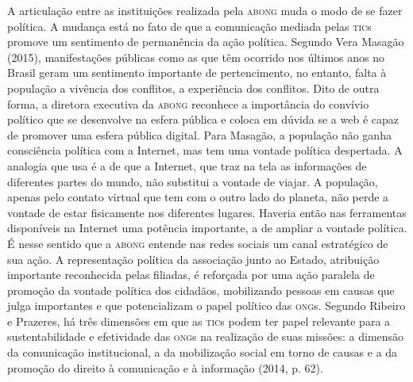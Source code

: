 A articulação entre as instituições realizada pela \textsc{abong} muda o modo de
se fazer política. A mudança está no fato de que a comunicação mediada
pelas \textsc{tic}s promove um sentimento de permanência da ação política.
Segundo Vera Masagão (2015), manifestações públicas como as que têm
ocorrido nos últimos anos no Brasil geram um sentimento importante de
pertencimento, no entanto, falta à população a vivência dos conflitos, a
experiência dos conflitos. Dito de outra forma, a diretora executiva da
\textsc{abong} reconhece a importância do convívio político que se desenvolve na
esfera pública e coloca em dúvida se a web é capaz de promover uma
esfera pública digital. Para Masagão, a população não ganha consciência
política com a Internet, mas tem uma vontade política despertada. A
analogia que usa é a de que a Internet, que traz na tela as informações
de diferentes partes do mundo, não substitui a vontade de viajar. A
população, apenas pelo contato virtual que tem com o outro lado do
planeta, não perde a vontade de estar fisicamente nos diferentes
lugares. Haveria então nas ferramentas disponíveis na Internet uma
potência importante, a de ampliar a vontade política. É nesse sentido
que a \textsc{abong} entende nas redes sociais um canal estratégico de sua ação.
A representação política da associação junto ao Estado, atribuição
importante reconhecida pelas filiadas, é reforçada por uma ação paralela
de promoção da vontade política dos cidadãos, mobilizando pessoas em
causas que julga importantes e que potencializam o papel político das
\textsc{ong}s. Segundo Ribeiro e Prazeres, há três dimensões em que as \textsc{tic}s podem
ter papel relevante para a sustentabilidade e efetividade das \textsc{ong}s na
realização de suas missões: a dimensão da comunicação institucional, a
da mobilização social em torno de causas e a da promoção do direito à
comunicação e à informação (2014, p. 62).

